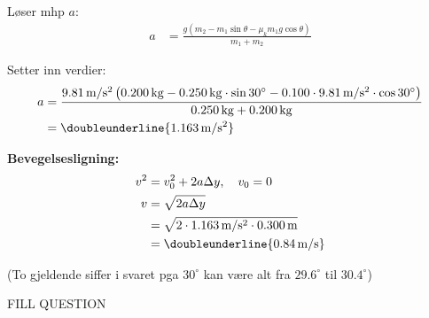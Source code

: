 \documentclass[answers,a4paper,12pt]{exam}
\begin{document}
\begin{questions}
\begin{parts}
\begin{solution}
Løser mhp $a$:
\begin{align*}
    a &= \frac{g(m_{2} - m_{1} \sin \theta - \mu_{k} m_{1} g \cos \theta)}{m_{1} + m_{2}}
\end{align*}

Setter inn verdier:
\begin{align*}
    a &= \frac{9.81 \, \mathrm{m/s^2} \left(0.200 \, \mathrm{kg} - 0.250 \, \mathrm{kg} \cdot \sin 30^{\circ} - 0.100 \cdot 9.81 \, \mathrm{m/s^2} \cdot \cos 30^{\circ}\right)}{0.250 \, \mathrm{kg} + 0.200 \, \mathrm{kg}} \\
    &= \doubleunderline{1.163 \, \mathrm{m/s^2}}
\end{align*}

\textbf{Bevegelsesligning:}
\begin{align*}
    v^2 &= v_0^2 + 2a\Delta y, \quad v_0 = 0 \\
    v &= \sqrt{2a\Delta y} \\
    &= \sqrt{2 \cdot 1.163 \, \mathrm{m/s^2} \cdot 0.300 \, \mathrm{m}} \\
    &= \doubleunderline{0.84 \, \mathrm{m/s}}
\end{align*}

(To gjeldende siffer i svaret pga $30^{\circ}$ kan være alt fra $29.6^{\circ}$ til $30.4^{\circ}$)
\end{solution}

\end{parts}


\question FILL QUESTION
\end{questions}
\end{document}
